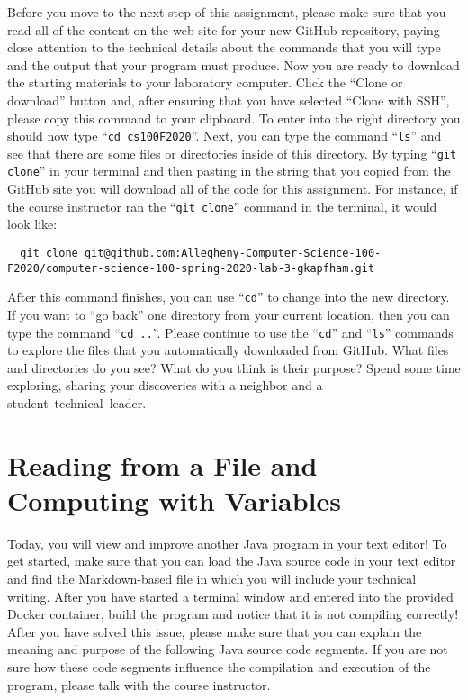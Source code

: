 \documentclass[11pt]{article}
\newcommand{\command}[1]{``\lstinline{#1}''}
\newcommand{\step}[1]{``{#1}''}
\begin{document}
Before you move to the next step of this assignment, please make sure that you
read all of the content on the web site for your new GitHub repository, paying
close attention to the technical details about the commands that you will type
and the output that your program must produce. Now you are ready to download the
starting materials to your laboratory computer. Click the ``Clone or download''
button and, after ensuring that you have selected ``Clone with SSH'', please
copy this command to your clipboard. To enter into the right directory you
should now type \command{cd cs100F2020}. Next, you can type the command
\command{ls} and see that there are some files or directories inside of this
directory. By typing \command{git clone} in your terminal and then pasting in
the string that you copied from the GitHub site you will download all of the
code for this assignment. For instance, if the course instructor ran the
\command{git clone} command in the terminal, it would look like:

\begin{lstlisting}
  git clone git@github.com:Allegheny-Computer-Science-100-F2020/computer-science-100-spring-2020-lab-3-gkapfham.git
\end{lstlisting}

After this command finishes, you can use \command{cd} to change into the new
directory. If you want to \step{go back} one directory from your current
location, then you can type the command \command{cd ..}. Please continue to use
the \command{cd} and \command{ls} commands to explore the files that you
automatically downloaded from GitHub. What files and directories do you see?
What do you think is their purpose? Spend some time exploring, sharing your
discoveries with a neighbor and a \mbox{student technical leader}.

\section*{Reading from a File and Computing with Variables}

Today, you will view and improve another Java program in your text editor! To
get started, make sure that you can load the Java source code in your text
editor and find the Markdown-based file in which you will include your technical
writing. After you have started a terminal window and entered into the provided
Docker container, build the program and notice that it is not compiling
correctly! After you have solved this issue, please make sure that you can
explain the meaning and purpose of the following Java source code segments. If
you are not sure how these code segments influence the compilation and execution
of the program, please talk with the course instructor.
\end{document}

